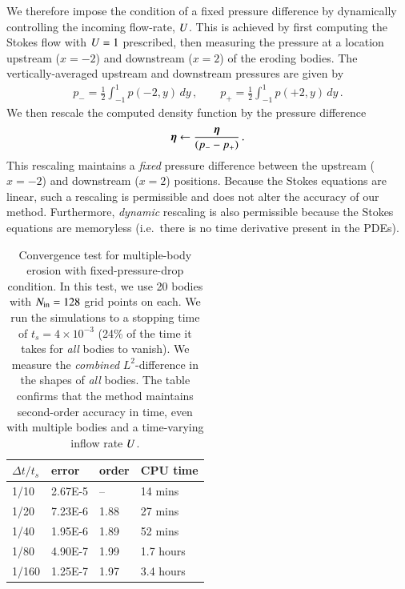 \documentclass[preprint, 10pt]{elsarticle}
\begin{document}
We therefore impose the condition of a fixed pressure difference by dynamically controlling the incoming flow-rate, $U$. This is achieved by first computing the Stokes flow with $U = 1$ prescribed, then measuring the pressure at a location upstream ($x = -2$) and downstream ($x=2$) of the eroding bodies. The vertically-averaged upstream and downstream pressures are given by
\begin{align}
p_{-} = \frac{1}{2} \int_{-1}^{1} p(-2,y) \, dy \, , \qquad
p_{+} = \frac{1}{2} \int_{-1}^{1} p(+2,y) \, dy \, .
\end{align}
We then rescale the computed density function by the pressure difference
\begin{align}
{\boldsymbol\eta} \leftarrow \frac{{\boldsymbol\eta}}{(p_{-} - p_{+})} \, .
\end{align}
This rescaling maintains a {\em fixed} pressure difference between the upstream ($x=-2$) and downstream ($x=2$) positions. Because the Stokes equations are linear, such a rescaling is permissible and does not alter the accuracy of our method. Furthermore, {\em dynamic} rescaling is also permissible because the Stokes equations are memoryless (i.e.~there is no time derivative present in the PDEs).

\begin{table}%
\begin{center}
\caption{Convergence test for multiple-body erosion with fixed-pressure-drop condition. In this test, we use 20 bodies with $N_{\mathrm{in}} = 128$ grid points on each. We run the simulations to a stopping time of $t_s = 4 \times 10^{-3}$ (24\% of the time it takes for {\em all} bodies to vanish). We measure the {\em combined} $L^2$-difference in the shapes of {\em all} bodies. The table confirms that the method maintains second-order accuracy in time, even with multiple bodies and a time-varying inflow rate $U$.
}
\vspace{0.3 pc}
\label{convtab}
\begin{tabular}{l l l l}
\hline
\hspace{0.0pc} $\Delta t/t_s$
\hspace{0.5pc} & error 
\hspace{0.5pc} & order
\hspace{0.5pc} & CPU time \\
\hline
%
1/10     	& 2.67E-5  	& --        	& 14 mins  	\\
1/20     	& 7.23E-6  	& 1.88 	& 27 mins  	\\
1/40     	& 1.95E-6  	& 1.89 	& 52 mins  	\\
1/80     	& 4.90E-7  	& 1.99 	& 1.7 hours	\\
1/160     	& 1.25E-7  	& 1.97  	& 3.4 hours	\\
%
\hline
\end{tabular}
\end{center}
\end{table}
\end{document}
